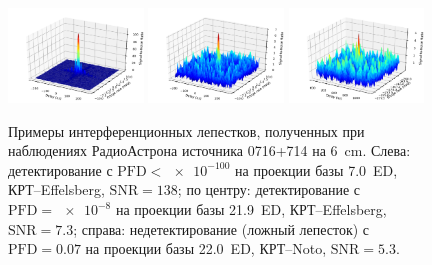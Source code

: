 \begin{figure}[tbh]
    \centering
    \includegraphics[width=0.32\textwidth,trim=1.5cm 0cm 0cm
1cm,clip]{0716+714_raks08jh_c_19_fringe3D.pdf}
    \includegraphics[width=0.32\textwidth,trim=1.5cm 0cm 0cm
1cm,clip]{0716+714_raks08mr_c_17_fringe3D.pdf}
    \includegraphics[width=0.32\textwidth,trim=1.5cm 0cm 0cm
1cm,clip]{0716+714_raks08mr_c_07_fringe3D.pdf}
    \caption{Примеры интерференционных лепестков, полученных при наблюдениях РадиоАстрона источника
0716+714 на \SI{6}{\cm}. Слева: детектирование с $\text{PFD} < \num{e-100}$ на проекции базы
7.0~ED, КРТ--Effelsberg, $\text{SNR}=138$; по центру: детектирование с $\text{PFD} = \num{e-8}$ на
проекции базы 21.9~ED, КРТ--Effelsberg, $\text{SNR}=7.3$; справа: недетектирование (ложный
лепесток) с $\text{PFD} = 0.07$ на проекции базы 22.0~ED, КРТ--Noto, $\text{SNR}=5.3$.}
    \label{fig:RAsurvey_fringes}
\end{figure}

